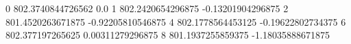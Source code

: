 0 802.3740844726562 0.0
1 802.2420654296875 -0.13201904296875
2 801.4520263671875 -0.92205810546875
4 802.1778564453125 -0.19622802734375
6 802.377197265625 0.00311279296875
8 801.1937255859375 -1.18035888671875
